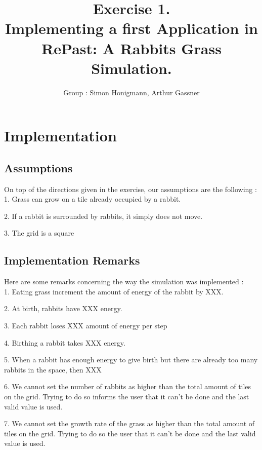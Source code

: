 \documentclass[11pt]{article}
\title{\bf Exercise 1.\\ Implementing a first Application in RePast: A Rabbits Grass Simulation.}
\author{Group \textnumero76: Simon Honigmann, Arthur Gassner}
\begin{document}
\maketitle

\section{Implementation}

\subsection{Assumptions}
On top of the directions given in the exercise, our assumptions are the following :\\

1. Grass can grow on a tile already occupied by a rabbit.

2. If a rabbit is surrounded by rabbits, it simply does not move.

3. The grid is a square

\subsection{Implementation Remarks}
Here are some remarks concerning the way the simulation was implemented :\\
	
	1. Eating grass increment the amount of energy of the rabbit by XXX.
	
	2. At birth, rabbits have XXX energy.
	
	3. Each rabbit loses XXX amount of energy per step
	
	4. Birthing a rabbit takes XXX energy.
	
	5. When a rabbit has enough energy to give birth but there are already too many rabbits in the space, then XXX
	
	6. We cannot set the number of rabbits as higher than the total amount of tiles on the grid. Trying to do so informs the user that it can't be done and the last valid value is used.
	
	7. We cannot set the growth rate of the grass as higher than the total amount of tiles on the grid. Trying to do so the user that it can't be done and the last valid value is used.
	
\end{document}

